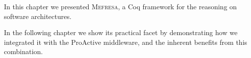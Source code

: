 	







\chapbreak

	In this chapter we presented \textsc{Mefresa}, a Coq framework for the reasoning on software architectures.
	
		In the following chapter we show its practical facet by demonstrating how we integrated it		
		with the ProActive middleware, and the inherent benefits from this combination.



